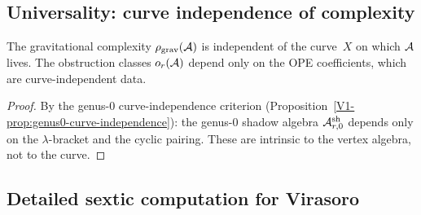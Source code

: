 
\subsection{Universality: curve independence of complexity}

\begin{proposition}
\ClaimStatusProvedHere
{}
The gravitational complexity $\rho_{\mathrm{grav}}(\mathcal{A})$ is
independent of the curve~$X$ on which $\mathcal{A}$ lives. The
obstruction classes $o_r(\mathcal{A})$ depend only on the OPE
coefficients, which are curve-independent data.
\end{proposition}

\begin{proof}
By the genus-$0$ curve-independence criterion
(Proposition~\ref{V1-prop:genus0-curve-independence}):
the genus-$0$ shadow algebra $\mathcal{A}^{\mathrm{sh}}_{r,0}$
depends only on the $\lambda$-bracket and the cyclic
pairing. These are intrinsic to the vertex algebra,
not to the curve.
\end{proof}



\subsection{Detailed sextic computation for Virasoro}


